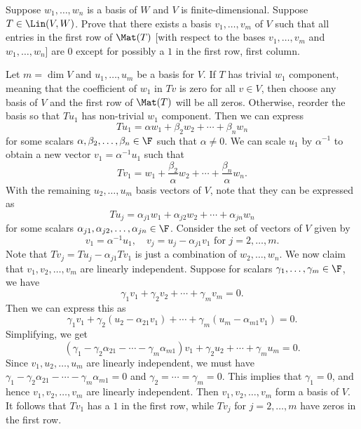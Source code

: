 \begin{exc}
\begin{exercise}
Suppose $w_1,\dots,w_n$ is a basis of $W$ and $V$ is finite-dimensional.
Suppose $T\in\Lin(V,W)$. Prove that there exists a basis $v_1,\dots,v_m$ of $V$
such that all entries in the first row of $\Mat(T)$ [with respect to the bases
$v_1,\dots,v_m$ and $w_1,\dots,w_n$] are $0$ except for possibly a $1$ in the
first row, first column.
\end{exercise}
\begin{solution}
Let $m=\dim V$ and $u_1,\dots,u_m$ be a basis for $V$. If $T$ has trivial $w_1$
component, meaning that the coefficient of $w_1$ in $Tv$ is zero for all
$v\in V$, then choose any basis of $V$ and the first row of $\Mat(T)$ will be
all zeros. Otherwise, reorder the basis so that $Tu_1$ has non-trivial $w_1$
component. Then we can express
\[ Tu_1 = \alpha w_1+\beta_2w_2+\cdots+\beta_nw_n \]
for some scalars $\alpha,\beta_2,\dots,\beta_n\in\F$ such that $\alpha\ne0$. We
can scale $u_1$ by $\alpha^{-1}$ to obtain a new vector $v_1=\alpha^{-1}u_1$
such that
\[ Tv_1 = w_1+\frac{\beta_2}{\alpha}w_2+\cdots+\frac{\beta_n}{\alpha}w_n. \]
With the remaining $u_2,\dots,u_m$ basis vectors of $V$, note that they can be
expressed as
\[ Tu_j = \alpha_{j1}w_1+\alpha_{j2}w_2+\cdots+\alpha_{jn}w_n \]
for some scalars $\alpha_{j1},\alpha_{j2},\dots,\alpha_{jn}\in\F$. Consider the
set of vectors of $V$ given by
\[ v_1 = \alpha^{-1}u_1, \quad v_j = u_j-\alpha_{j1}v_1 \text{ for }
   j=2,\dots,m. \]
Note that $Tv_j=Tu_j-\alpha_{j1}Tv_1$ is just a combination of
$w_2,\dots,w_n$. We now claim that $v_1,v_2,\dots,v_m$ are linearly
independent. Suppose for scalars $\gamma_1,\dots,\gamma_m\in\F$, we have
\[ \gamma_1v_1+\gamma_2v_2+\cdots+\gamma_mv_m = 0. \]
Then we can express this as
\[ \gamma_1v_1+\gamma_2(u_2-\alpha_{21}v_1)+\cdots+\gamma_m(u_m-\alpha_{m1}v_1)
   = 0. \]
Simplifying, we get
\[ (\gamma_1-\gamma_2\alpha_{21}-\cdots-\gamma_m\alpha_{m1})v_1
   +\gamma_2u_2+\cdots+\gamma_mu_m = 0. \]
Since $v_1,u_2,\dots,u_m$ are linearly independent, we must have
$\gamma_1-\gamma_2\alpha_{21}-\cdots-\gamma_m\alpha_{m1}=0$ and
$\gamma_2=\cdots=\gamma_m=0$. This implies that $\gamma_1=0$, and hence
$v_1,v_2,\dots,v_m$ are linearly independent. Then $v_1,v_2,\dots,v_m$ form a
basis of $V$. It follows that $Tv_1$ has a $1$ in the first row, while $Tv_j$
for $j=2,\dots,m$ have zeros in the first row.
\end{solution}


\end{exc}
